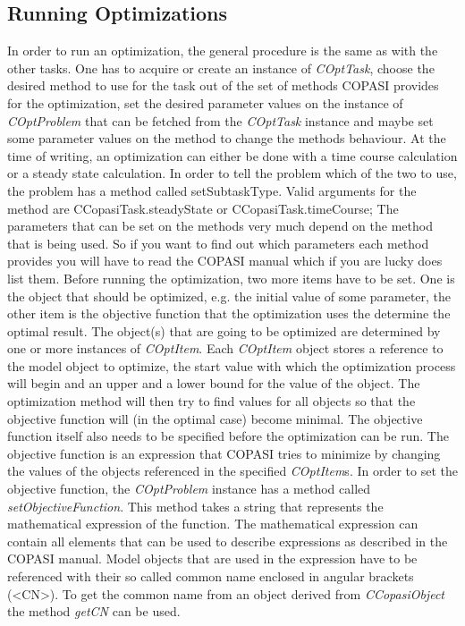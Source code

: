 \documentclass[a4,10pt]{article}
\begin{document}
\subsection{Running Optimizations}
In order to run an optimization, the general procedure is the same as with the other tasks. One has to acquire or create an instance of \textit{COptTask}, choose the desired method to use for the task out of the set of methods COPASI provides for the optimization, set the desired parameter values on the instance of \textit{COptProblem} that can be fetched from the \textit{COptTask} instance and maybe set some parameter values on the method to change the methods behaviour.
At the time of writing, an optimization can either be done with a time course calculation or a steady state calculation. In order to tell the problem which of the two to use, the problem has a method called setSubtaskType. Valid arguments for the method are CCopasiTask.steadyState or CCopasiTask.timeCourse;
The parameters that can be set on the methods very much depend on the method that is being used. So if you want to find out which parameters each method provides you will have to read the COPASI manual which if you are lucky does list them.
Before running the optimization, two more items have to be set. One is the object that should be optimized, e.g. the initial value of some parameter, the other item is the objective function that the optimization uses the determine the optimal result.
The object(s) that are going to be optimized are determined by one or more instances of \textit{COptItem}. Each \textit{COptItem} object stores a reference to the model object to optimize, the start value with which the optimization process will begin and an upper and a lower bound for the value of the object. The optimization method will then try to find values for all objects so that the objective function will (in the optimal case) become minimal.
The objective function itself also needs to be specified before the optimization can be run. The objective function is an expression that COPASI tries to minimize by changing the values of the objects referenced in the specified \textit{COptItem}s. In order to set the objective function, the \textit{COptProblem} instance has a method called \textit{setObjectiveFunction}. This method takes a string that represents the mathematical expression of the function. The mathematical expression can contain all elements that can be used to describe expressions as described in the COPASI manual. Model objects that are used in the expression have to be referenced with their so called common name enclosed in angular brackets (<CN>). To get the common name from an object derived from \textit{CCopasiObject} the method \textit{getCN} can be used.
\end{document}

